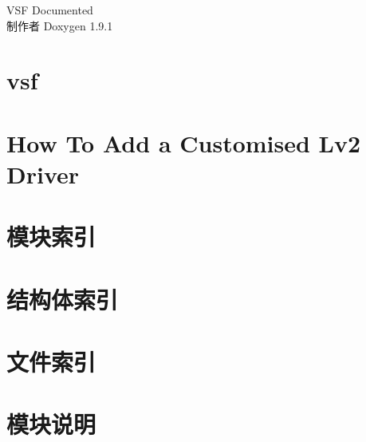 \let\mypdfximage\pdfximage\def\pdfximage{\immediate\mypdfximage}\documentclass[twoside]{book}
\newcommand{\+}{\discretionary{\mbox{\scriptsize$\hookleftarrow$}}{}{}}
\newcommand{\clearemptydoublepage}{%
  \newpage{\pagestyle{empty}\cleardoublepage}%
}
\begin{document}
\raggedbottom
\begin{CJK}{UTF8}{min}

\hypersetup{pageanchor=false,
             bookmarksnumbered=true,
             pdfencoding=unicode
            }
\begin{titlepage}
\vspace*{7cm}
\begin{center}%
{\Large VSF Documented }\\
\vspace*{1cm}
{\large 制作者 Doxygen 1.9.1}\\
\end{center}
\end{titlepage}
\clearemptydoublepage
{}
\tableofcontents
\clearemptydoublepage
{}
\hypersetup{pageanchor=true}

\chapter{vsf}
\label{index}\hypertarget{index}{}
\chapter{How To Add a Customised Lv2 Driver}
\label{md_source_osa_hal_driver_customised_readme}

\chapter{模块索引}

\chapter{结构体索引}

\chapter{文件索引}

\chapter{模块说明}




\end{CJK}
\end{document}
